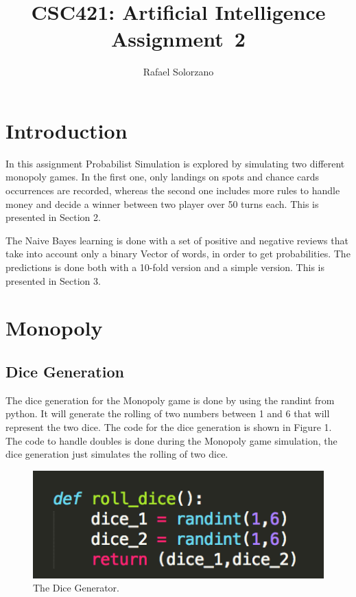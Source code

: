 \documentclass[12pt, letter]{article}
\newcommand{\courseName}{CSC421: Artificial Intelligence}
\newcommand{\assignName}{Assignment~2}
\begin{document}
\pagestyle{titlesec_assignment}

\title{\courseName\\\assignName}
\author{Rafael Solorzano}
\maketitle

\section{Introduction}

 In this assignment Probabilist Simulation is explored by simulating two different monopoly games. In the first one, only landings on spots and chance cards occurrences are recorded, whereas the second one includes more rules to handle money and decide a winner between two player over 50 turns each. This is presented in Section 2. 

The Naive Bayes learning is done with a set of positive and negative reviews that take into account only a binary Vector of words, in order to get probabilities. The predictions is done both with a 10-fold version and a simple version. This is presented in Section 3. 

\section{Monopoly}

\subsection{Dice Generation}

The dice generation for the Monopoly game is done by using the randint from python. It will generate the rolling of two numbers between 1 and 6 that will represent the two dice. The code for the dice generation is shown in Figure 1. The code to handle doubles is done during the Monopoly game simulation, the dice generation just simulates the rolling of two dice. 

 \begin{figure}[htb]
  \centering
  \includegraphics[width=0.40 \textwidth]{./figures/dice.png}
  \caption{The Dice Generator.}
\end{figure}
\end{document}
